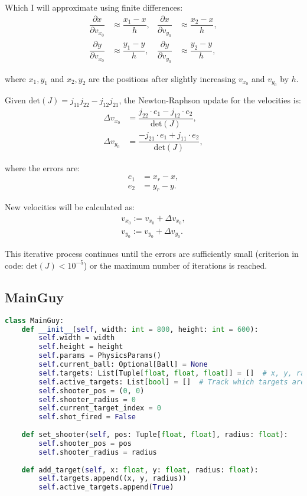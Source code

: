 \documentclass{article}
\begin{document}
	Which I will approximate using finite differences:
	\begin{align*}
		\dfrac{\partial x}{\partial v_{x_0}} &\approx \dfrac{x_1 - x}{h}, &
		\dfrac{\partial x}{\partial v_{y_0}} &\approx \dfrac{x_2 - x}{h}, \\
		\dfrac{\partial y}{\partial v_{x_0}} &\approx \dfrac{y_1 - y}{h}, &
		\dfrac{\partial y}{\partial v_{y_0}} &\approx \dfrac{y_2 - y}{h},
	\end{align*}
	
	where $x_1, y_1$ and $x_2, y_2$ are the positions after slightly increasing $v_{x_0}$ and $v_{y_0}$ by $h$.
	
	Given $\text{det}(J) = j_{11} j_{22} - j_{12} j_{21}$, the Newton-Raphson update for the velocities is:
	\begin{align*}
		\Delta v_{x_0} &= \dfrac{j_{22} \cdot e_1 - j_{12} \cdot e_2}{\text{det}(J)}, \\
		\Delta v_{y_0} &= \dfrac{-j_{21} \cdot e_1 + j_{11} \cdot e_2}{\text{det}(J)},
	\end{align*}
	
	where the errors are:
	\begin{align*}
		e_1 &= x_r - x, \\
		e_2 &= y_r - y.
	\end{align*}
	
	New velocities will be calculated as:
	\begin{align*}
		v_{x_0} := v_{x_0} + \Delta v_{x_0}, \\
		v_{y_0} := v_{y_0} + \Delta v_{y_0}.
	\end{align*}
	
	This iterative process continues until the errors are sufficiently small (criterion in code: $\text{det}(J) < 10^{-5}$) or the maximum number of iterations is reached.

	\newpage
	\subsection*{MainGuy}
\begin{lstlisting}[language=python]
class MainGuy:
	def __init__(self, width: int = 800, height: int = 600):
		self.width = width
		self.height = height
		self.params = PhysicsParams()
		self.current_ball: Optional[Ball] = None
		self.targets: List[Tuple[float, float, float]] = []  # x, y, radius
		self.active_targets: List[bool] = []  # Track which targets are still active
		self.shooter_pos = (0, 0)
		self.shooter_radius = 0
		self.current_target_index = 0
		self.shot_fired = False
	
	def set_shooter(self, pos: Tuple[float, float], radius: float):
		self.shooter_pos = pos
		self.shooter_radius = radius
	
	def add_target(self, x: float, y: float, radius: float):
		self.targets.append((x, y, radius))
		self.active_targets.append(True)
\end{lstlisting}	
	
\end{document}
